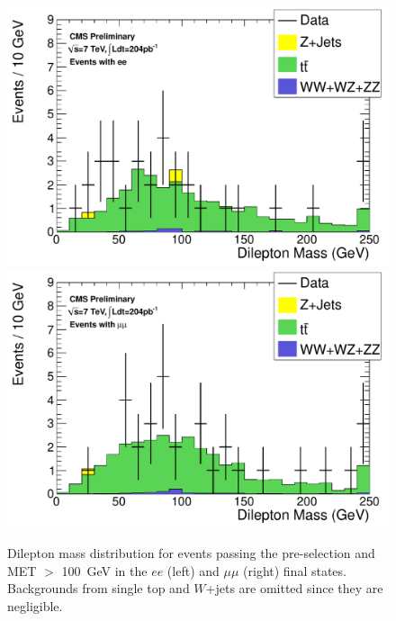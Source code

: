 \begin{figure}[hbt]
\begin{center}
\includegraphics[width=0.48\linewidth]{plots/hdilmass_pfmet100_ee_allj.pdf}
\includegraphics[width=0.48\linewidth]{plots/hdilmass_pfmet100_mm_allj.pdf}
\caption{\label{fig:dilmass100}\protect Dilepton mass distribution for events passing the pre-selection 
  and MET $>$ 100~GeV in the $ee$ (left) and $\mu\mu$ (right) final states. 
Backgrounds from single top and $W$+jets are omitted since they are negligible.}
\end{center}
\end{figure}
